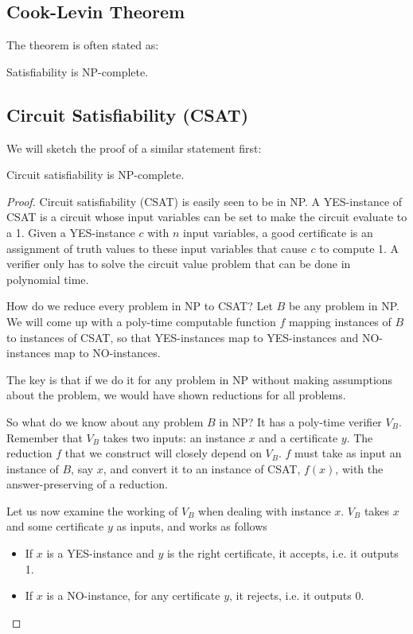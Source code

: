 \subsection{Cook-Levin Theorem}
The theorem is often stated as:
\begin{theorem}
	Satisfiability is NP-complete.
\end{theorem}
\subsection{Circuit Satisfiability (CSAT)}
We will sketch the proof of a similar statement first:
\begin{theorem}
	Circuit satisfiability is NP-complete.
\end{theorem}

\begin{proof}
	Circuit satisfiability (CSAT) is easily seen to be in NP. A YES-instance of CSAT is a circuit whose input variables can be set to make the circuit evaluate to a 1. Given a YES-instance $c$ with $n$ input variables, a good certificate is an assignment of truth values to these input variables that cause $c$ to compute 1. A verifier only has to solve the circuit value problem that can be done in polynomial time.
	
	How do we reduce every problem in NP to CSAT? Let $B$ be any problem in NP. We will come up with a poly-time computable function $f$ mapping instances of $B$ to instances of CSAT, so that YES-instances map to YES-instances and NO-instances map to NO-instances.
	
	The key is that if we do it for any problem in NP without making assumptions about the problem, we would have shown reductions for all problems.
	
	So what do we know about any problem $B$ in NP? It has a poly-time verifier $V_B$. Remember that $V_B$ takes two inputs: an instance $x$ and a certificate $y$. The reduction $f$ that we construct will closely depend on $V_B$. $f$ must take as input an instance of $B$, say $x$, and convert it to an instance of CSAT, $f(x)$, with the answer-preserving of a reduction.
	
	Let us now examine the working of $V_B$ when dealing with instance $x$. $V_B$ takes $x$ and some certificate $y$ as inputs, and works as follows
	\begin{itemize}
		\item If $x$ is a YES-instance and $y$ is the right certificate, it accepts, i.e. it outputs 1.
		\item If $x$ is a NO-instance, for any certificate $y$, it rejects, i.e. it outputs 0.
	\end{itemize}


\end{proof}
